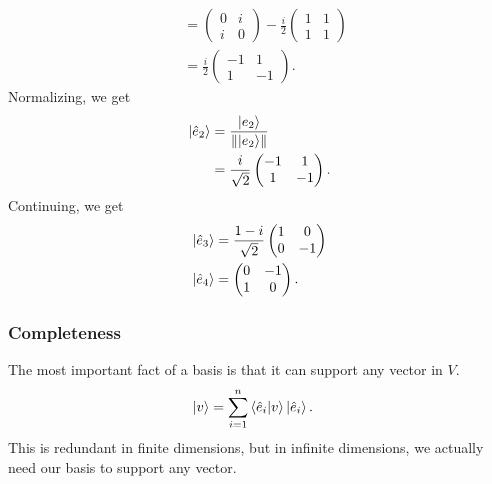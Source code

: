 \documentclass[10pt]{mypackage}
\begin{document}
\begin{example}
\begin{align*}
            &= \begin{pmatrix}0 & i \\ i & 0\end{pmatrix} - \frac{i}{2} \begin{pmatrix}1 & 1 \\ 1 & 1\end{pmatrix}\\
            &= \frac{i}{2} \begin{pmatrix}-1 & 1 \\ 1 & -1\end{pmatrix}.
\end{align*}
Normalizing, we get
\begin{align*}
  \ket{\hat{e}_2} &= \frac{\ket{e_2}}{\norm{\ket{e_2}}}\\
                  &= \frac{i}{\sqrt{2}} \begin{pmatrix}-1 & 1 \\ 1 & -1\end{pmatrix}.
\end{align*}
Continuing, we get
\begin{align*}
  \ket{\hat{e}_3} &= \frac{1-i}{\sqrt{2}} \begin{pmatrix}1 & 0 \\ 0 & -1\end{pmatrix}\\
  \ket{\hat{e}_4} &= \begin{pmatrix}0 & -1 \\ 1 & 0\end{pmatrix}.
\end{align*}

\end{example}
\subsubsection{Completeness}%
The most important fact of a basis is that it can support any vector in $V$.
\begin{align*}
  \ket{v} &= \sum_{i=1}^{n}\braket{\hat{e}_i}{v}\ket{\hat{e}_i}.
\end{align*}
This is redundant in finite dimensions, but in infinite dimensions, we actually need our basis to support any vector.\newline
\end{document}
